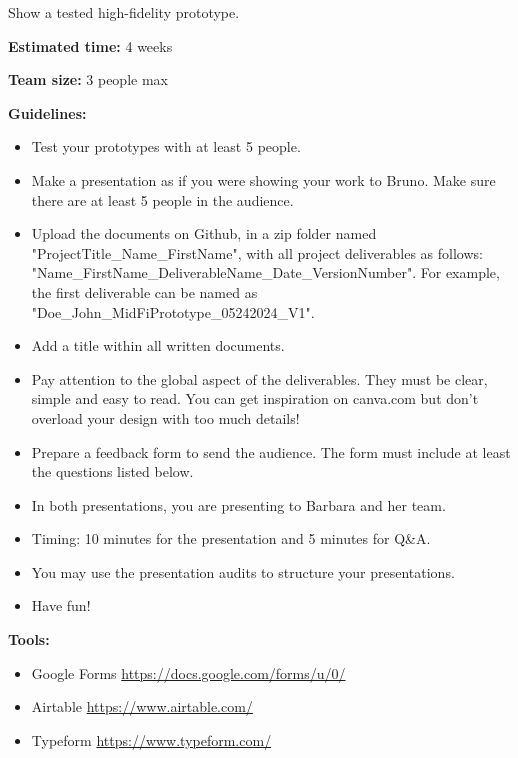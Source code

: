 \makeheaderfiles

Show a tested high-fidelity prototype.

\textbf{Estimated time:} 4 weeks

\textbf{Team size:} 3 people max

\textbf{Guidelines:}

\begin{itemize}
\item Test your prototypes with at least 5 people.
\item Make a presentation as if you were showing your work to Bruno. Make sure there are at least 5 people in the audience.
\item Upload the documents on Github, in a zip folder named "ProjectTitle\_Name\_FirstName", with all project deliverables as follows: "Name\_FirstName\_DeliverableName\_Date\_VersionNumber".  For example, the first deliverable can be named as "Doe\_John\_MidFiPrototype\_05242024\_V1".
\item Add a title within all written documents.
\item Pay attention to the global aspect of the deliverables. They must be clear, simple and easy to read. You can get inspiration on canva.com but don't overload your design with too much details!
\item Prepare a feedback form to send the audience. The form must include at least the questions listed below.
\item In both presentations, you are presenting to Barbara and her team.
\item Timing: 10 minutes for the presentation and 5 minutes for Q\&A.
\item You may use the presentation audits to structure your presentations.
\item Have fun!
\end{itemize}

\textbf{Tools:}

\begin{itemize}
\item Google Forms \url{https://docs.google.com/forms/u/0/}
\item Airtable \url{https://www.airtable.com/}
\item Typeform \url{https://www.typeform.com/}
\end{itemize}

